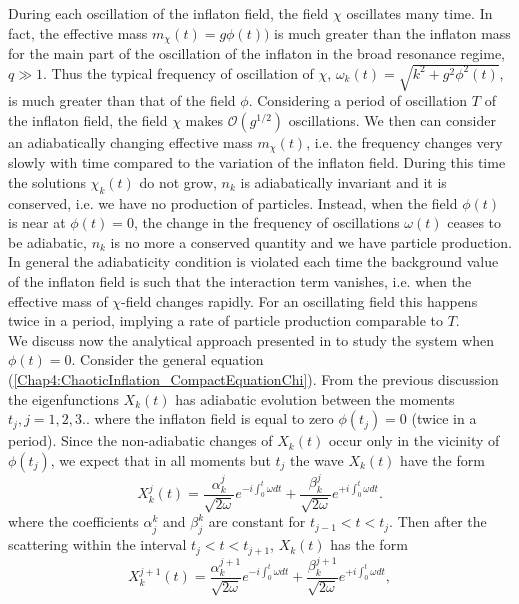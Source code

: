 \documentclass[11pt,a4paper,twoside]{book}
\begin{document}
During each oscillation of the inflaton field, the field $ \chi $ oscillates many time. In fact, the effective mass $ m_{\chi}(t) = g\phi(t)) $ is much greater than the inflaton mass for the main part of the oscillation of the inflaton in the broad resonance regime, $ q \gg  1$. Thus the typical frequency of oscillation of $ \chi $, $\omega_{k}(t) = \sqrt{k^{2} + g^{2}\phi^{2}(t)}$, is much greater than that of the field $\phi$. Considering a period of oscillation $ T $ of the inflaton field, the field $ \chi $ makes $\mathcal{O}(g^{1/2})$ oscillations. We then can consider an adiabatically changing effective mass $ m_{\chi}(t) $, i.e. the frequency changes very slowly with time compared to the variation of the inflaton field. During this time the solutions $\chi_{k}(t)$ do not grow, $ n_{k} $ is  adiabatically invariant and it is conserved, i.e. we have no production of particles. Instead, when the field $ \phi(t) $ is near at $ \phi(t)=0 $, the change in the frequency of oscillations $ \omega(t) $ ceases to be adiabatic, $ n_{k} $ is no more a conserved quantity and we have particle production. In general the adiabaticity condition is violated each time the background value of the inflaton field is such that the interaction term vanishes, i.e. when the effective mass of $\chi$-field changes rapidly. For an oscillating field this happens twice in a period, implying a rate of particle production comparable to $ T. $\\
We discuss now the analytical approach presented in \cite{Chap4:LindePreheatingModel} to study the system when $ \phi(t)=0 $. Consider the general equation (\ref{Chap4:ChaoticInflation_CompactEquationChi}). From the previous discussion the eigenfunctions $ X_{k}(t) $ has adiabatic evolution between the moments $ t_{j}, j=1,2,3.. $ where the inflaton field is equal to zero $ \phi(t_{j})=0 $ (twice in a period). Since the non-adiabatic changes of $ X_{k}(t) $ occur only in the vicinity of $\phi(t_{j})$, we expect that in all moments but $ t_{j} $ the wave $ X_{k}(t) $ have the form 
\begin{equation}
	\label{Chap4:ParabolicPotential_scatter1}
		X_{k}^{j}(t) = \frac{\alpha^{j}_{k}}{\sqrt{2\omega}}e^{-i\int^{t}_{0} \omega dt} 
	+ \frac{\beta^{j}_{k}}{\sqrt{2\omega}}e^{+i\int^{t}_{0} \omega dt}.
\end{equation}
where the coefficients $ \alpha_{j}^{k} $ and $ \beta_{j}^{k} $ are constant for $ t_{j-1} < t < t_{j} $. Then after the scattering within the interval $ t_{j}<t<t_{j+1} $, $ X_{k}(t) $ has the form
\begin{equation}
\label{Chap4:scattering2}
X_{k}^{j+1}(t) = \frac{\alpha^{j+1}_{k}}{\sqrt{2\omega}}e^{-i\int^{t}_{0} \omega dt} 
+ \frac{\beta^{j+1}_{k}}{\sqrt{2\omega}}e^{+i\int^{t}_{0} \omega dt},
\end{equation}
\end{document}
